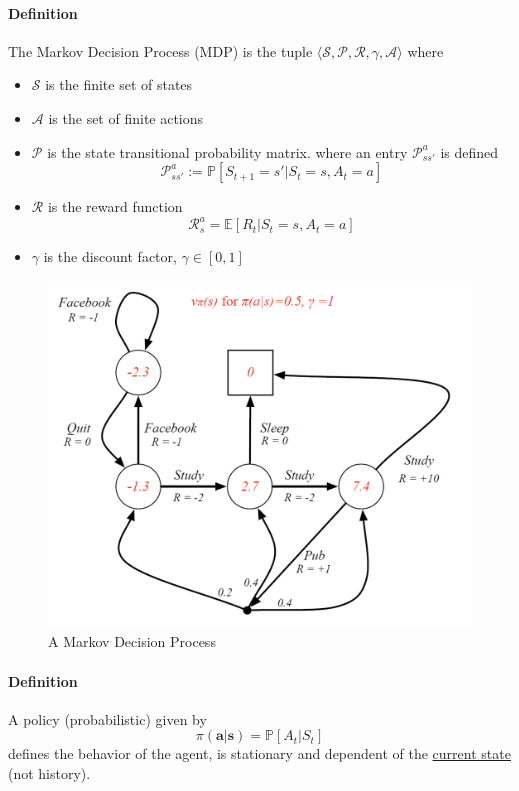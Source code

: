 	\paragraph{Definition} The Markov Decision Process (MDP) is the tuple $\langle \mathcal{S, P, R, \gamma, A} \rangle$ where 
	\begin{itemize}
	\item $\mathcal{S}$ is the finite set of states
	\item $\mathcal{A}$ is the set of finite actions 
	\item $\mathcal{P}$ is the state transitional probability matrix. where an entry $\mathcal{P}^a_{ss'}$ is defined
	\begin{equation*}
	\mathcal{P}^a_{ss'} := \mathbb{P}[S_{t+1} = s' | S_t = s, A_t = a] 
	\end{equation*}
	\item $\mathcal{R}$ is the reward function 
	\begin{equation*}
	\mathcal{R}^a_s = \mathbb{E}[R_t | S_t = s, A_t = a]
	\end{equation*}
	\item $\gamma$ is the discount factor, $\gamma \in [0,1]$
	\end{itemize}

	\begin{figure}[h]
	\centering
	\includegraphics[scale=0.5]{ch2fig2.png}
	\caption{A Markov Decision Process}
	\end{figure}

	\paragraph{Definition} A policy (probabilistic) given by
	\begin{equation*}
	\pi(\mathbf{a|s}) = \mathbb{P}[A_t|S_t] 
	\end{equation*}
	defines the behavior of the agent, is stationary and dependent of the \underline{current state} (not history). 

